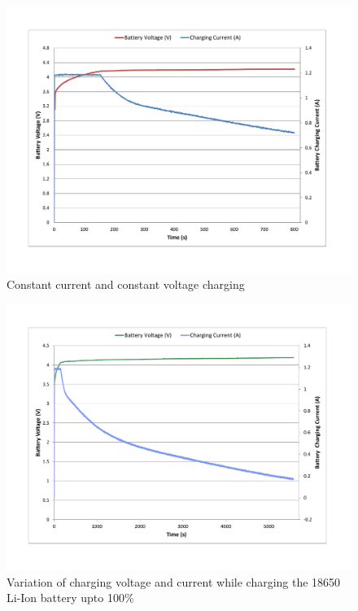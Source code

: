 \begin{figure}[H]
	\centering
	\includegraphics[width=0.9\columnwidth]{IMGS/Battery CC CV.pdf}
	\caption{Constant current and constant voltage charging}
	\label{fig:cccv}
\end{figure}
\begin{figure}[H]
	\centering
	\includegraphics[width=\columnwidth]{IMGS/Battery Charge Cycle.pdf}
	\caption{Variation of charging voltage and current while charging the 18650 Li-Ion battery upto 100\%}
	\label{fig:chargin'}
\end{figure}
